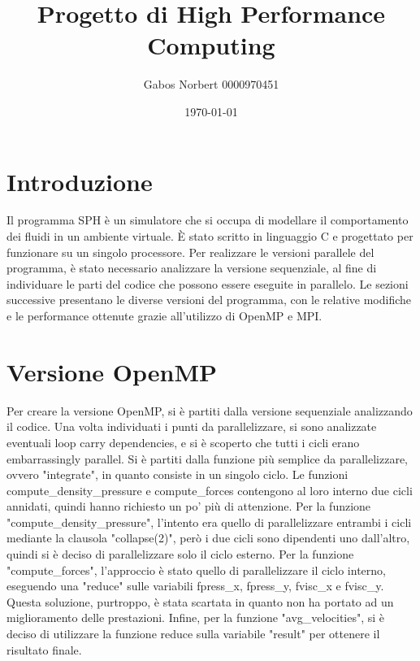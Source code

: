 \documentclass[a4paper,12pt, oneside]{article}
\title{Progetto di High Performance Computing}
\author{Gabos Norbert 0000970451}
\date{\today}
\begin{document}
\maketitle

\section{Introduzione}

Il programma SPH è un simulatore che si occupa di modellare il comportamento dei fluidi in un
ambiente virtuale. È stato scritto in linguaggio C e progettato per funzionare su un singolo
processore. Per realizzare le versioni parallele del programma, è stato necessario analizzare
la versione sequenziale, al fine di individuare le parti del codice che possono essere eseguite
in parallelo. Le sezioni successive presentano le diverse versioni del programma, con le
relative modifiche e le performance ottenute grazie all'utilizzo di OpenMP e MPI.

\section{Versione OpenMP}

Per creare la versione OpenMP, si è partiti dalla versione sequenziale analizzando il codice.
Una volta individuati i punti da parallelizzare, si sono analizzate eventuali loop carry
dependencies, e si è scoperto che tutti i cicli erano embarrassingly parallel. Si è partiti
dalla funzione più semplice da parallelizzare, ovvero "integrate", in quanto consiste in un
singolo ciclo. Le funzioni compute\_density\_pressure e compute\_forces contengono al loro
interno due cicli annidati, quindi hanno richiesto un po' più di attenzione.
Per la funzione "compute\_density\_pressure", l'intento era quello di parallelizzare entrambi
i cicli mediante la clausola "collapse(2)", però i due cicli sono dipendenti uno dall'altro,
quindi si è deciso di parallelizzare solo il ciclo esterno. Per la funzione "compute\_forces",
l'approccio è stato quello di parallelizzare il ciclo interno, eseguendo una "reduce" sulle
variabili fpress\_x, fpress\_y, fvisc\_x e fvisc\_y. Questa soluzione, purtroppo, è stata
scartata in quanto non ha portato ad un miglioramento delle prestazioni.
Infine, per la funzione "avg\_velocities", si è deciso di utilizzare la funzione reduce sulla
variabile "result" per ottenere il risultato finale.

\end{document}
